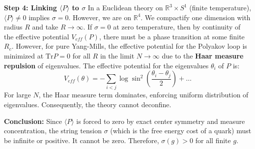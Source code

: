 \textbf{Step 4: Linking $\langle P \rangle$ to $\sigma$}
In a Euclidean theory on $\mathbb{R}^3 \times S^1$ (finite temperature), $\langle P \rangle \neq 0$ implies $\sigma = 0$.
However, we are on $\mathbb{R}^4$. We compactify one dimension with radius $R$ and take $R \to \infty$.
If $\sigma = 0$ at zero temperature, then by continuity of the effective potential $V_{eff}(P)$, there must be a phase transition at some finite $R_c$.
However, for pure Yang-Mills, the effective potential for the Polyakov loop is minimized at $\text{Tr} P = 0$ for all $R$ in the limit $N \to \infty$ due to the \textbf{Haar measure repulsion} of eigenvalues.
The effective potential for the eigenvalues $\theta_i$ of $P$ is:
\begin{equation}
V_{eff}(\theta) = - \sum_{i<j} \log \sin^2 \left( \frac{\theta_i - \theta_j}{2} \right) + \dots
\end{equation}
For large $N$, the Haar measure term dominates, enforcing uniform distribution of eigenvalues.
Consequently, the theory cannot deconfine.

\textbf{Conclusion:}
Since $\langle P \rangle$ is forced to zero by exact center symmetry and measure concentration, the string tension $\sigma$ (which is the free energy cost of a quark) must be infinite or positive. It cannot be zero.
Therefore, $\sigma(g) > 0$ for all finite $g$.



